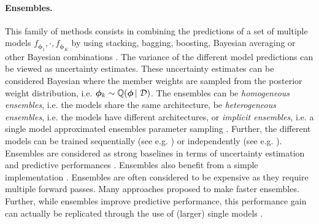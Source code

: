 \paragraph*{Ensembles.} This family of methods consists in combining the predictions of a set of multiple models $f_{\bm{\phi}_1},\cdot, f_{\bm{\phi}_K}$ by using stacking, bagging, boosting, Bayesian averaging or other Bayesian combinations \citep{bayesian-averaging-to-combination}. The variance of the different model predictions can be viewed as uncertainty estimates. These uncertainty estimates can be considered Bayesian where the member weights are sampled from the posterior weight distribution, i.e. $\bm{\phi}_k \sim \operatorname{\mathbb{Q}}(\bm{\phi} \,|\, \operatorname{\mathcal{D}})$. The ensembles can be \emph{homogeneous ensembles}, i.e. the models share the same architecture, be \emph{heterogeneous ensembles}, i.e. the models have different architectures, or \emph{implicit ensembles}, i.e. a single model approximated ensembles parameter sampling \citep{abe2022deep}. Further, the different models can be trained sequentially (see e.g. \citep{schapire2013explaining, chenG16xgboost}) or independently (see e.g. \citep{ensembles}).
%
Ensembles are considered as strong baselines in terms of uncertainty estimation and predictive performances \citep{dataset-shift}. Ensembles also benefit from a simple implementation \citep{ensembles}.
%
Ensembles are often considered to be expensive as they require multiple forward passes. Many approaches \citep{batch-ensembles,mimo-independent-subnetworks} proposed to make faster ensembles. Further, while ensembles improve predictive performance, this performance gain can actually be replicated through the use of (larger) single models \citep{abe2022deep}.

